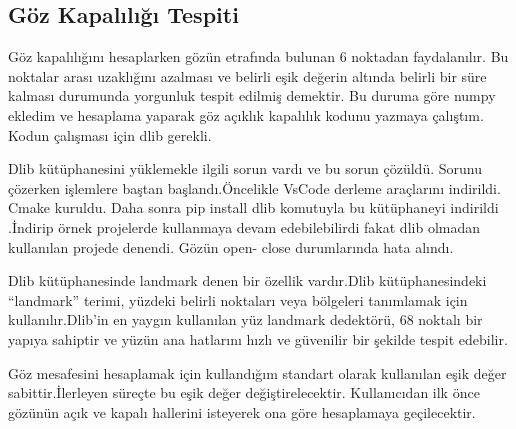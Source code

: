 \documentclass[12pt, a4paper]{article}
\begin{document}
   \subsection{Göz Kapalılığı Tespiti}
   Göz kapalılığını hesaplarken gözün etrafında bulunan 6 noktadan faydalanılır. Bu noktalar arası uzaklığını azalması ve belirli eşik değerin altında belirli bir süre kalması durumunda yorgunluk tespit edilmiş demektir. Bu duruma göre numpy ekledim ve hesaplama yaparak göz açıklık kapalılık kodunu yazmaya çalıştım. Kodun çalışması için dlib gerekli.\par
	Dlib kütüphanesini yüklemekle ilgili sorun vardı ve bu sorun çözüldü. Sorunu çözerken işlemlere baştan başlandı.Öncelikle VsCode derleme araçlarını indirildi. Cmake kuruldu. Daha sonra pip install dlib komutuyla bu kütüphaneyi indirildi \cite{onursahin}.İndirip örnek projelerde kullanmaya devam edebilebilirdi fakat dlib olmadan kullanılan projede denendi. Gözün open- close durumlarında hata alındı.\par 
	 Dlib kütüphanesinde landmark denen bir özellik vardır.Dlib kütüphanesindeki “landmark” terimi, yüzdeki belirli noktaları veya bölgeleri tanımlamak için kullanılır.Dlib’in en yaygın kullanılan yüz landmark dedektörü, 68 noktalı bir yapıya sahiptir ve yüzün ana hatlarını hızlı ve güvenilir bir şekilde tespit edebilir. \par Göz mesafesini hesaplamak için kullandığım standart olarak kullanılan eşik değer sabittir.İlerleyen süreçte bu eşik değer değiştirelecektir. Kullanıcıdan ilk önce gözünün açık ve kapalı hallerini isteyerek ona göre hesaplamaya geçilecektir. \newpage
\end{document}
